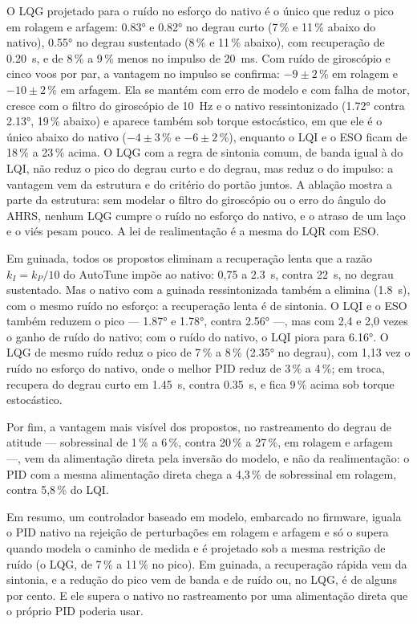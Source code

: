 O LQG projetado para o ruído no esforço do nativo é o único que reduz o pico
em rolagem e arfagem: \ang{0.83} e \ang{0.82} no degrau curto (7\,\% e
11\,\% abaixo do nativo), \ang{0.55} no degrau sustentado (8\,\% e 11\,\%
abaixo), com recuperação de \SI{0.20}{\second}, e de 8\,\% a 9\,\% menos no
impulso de \SI{20}{\milli\second}. Com ruído de giroscópio e cinco voos por
par, a vantagem no impulso se confirma: $-9 \pm 2$\,\% em rolagem e
$-10 \pm 2$\,\% em arfagem. Ela se mantém com erro de modelo e com falha de
motor, cresce com o filtro do giroscópio de \SI{10}{\hertz} e o nativo
ressintonizado (\ang{1.72} contra \ang{2.13}, 19\,\% abaixo) e aparece também
sob torque estocástico, em que ele é o único abaixo do nativo
($-4 \pm 3$\,\% e $-6 \pm 2$\,\%), enquanto o LQI e o ESO ficam de 18\,\% a
23\,\% acima. O LQG com a regra de sintonia comum, de banda igual à do LQI,
não reduz o pico do degrau curto e do degrau, mas reduz o do impulso: a
vantagem vem da estrutura e do critério do portão juntos. A ablação mostra a
parte da estrutura: sem modelar o filtro do giroscópio ou o erro do ângulo
do AHRS, nenhum LQG cumpre o ruído no esforço do nativo, e o atraso de um
laço e o viés pesam pouco. A lei de realimentação é a mesma do LQR com ESO.

Em guinada, todos os propostos eliminam a recuperação lenta que a razão
$k_I = k_P/10$ do AutoTune impõe ao nativo: 0,75 a \SI{2.3}{\second}, contra
\SI{22}{\second}, no degrau sustentado. Mas o nativo com a guinada
ressintonizada também a elimina (\SI{1.8}{\second}), com o mesmo ruído no
esforço: a recuperação lenta é de sintonia. O LQI e o ESO também reduzem o
pico --- \ang{1.87} e \ang{1.78}, contra \ang{2.56} ---, mas com 2,4 e 2,0
vezes o ganho de ruído do nativo; com o ruído do nativo, o LQI piora para
\ang{6.16}. O LQG de mesmo ruído reduz o pico de 7\,\% a 8\,\% (\ang{2.35}
no degrau), com 1,13 vez o ruído no esforço do nativo, onde o melhor PID
reduz de 3\,\% a 4\,\%; em troca, recupera do degrau curto em
\SI{1.45}{\second}, contra \SI{0.35}{\second}, e fica 9\,\% acima sob torque
estocástico.

Por fim, a vantagem mais visível dos propostos, no rastreamento do degrau de
atitude --- sobressinal de 1\,\% a 6\,\%, contra 20\,\% a 27\,\%, em rolagem e
arfagem ---, vem da alimentação direta pela inversão do modelo, e não da
realimentação: o PID com a mesma alimentação direta chega a 4,3\,\% de
sobressinal em rolagem, contra 5,8\,\% do LQI.

Em resumo, um controlador baseado em modelo, embarcado no firmware, iguala o
PID nativo na rejeição de perturbações em rolagem e arfagem e só o supera
quando modela o caminho de medida e é projetado sob a mesma restrição de
ruído (o LQG, de 7\,\% a 11\,\% no pico). Em guinada, a recuperação rápida
vem da sintonia, e a redução do pico vem de banda e de ruído ou, no LQG, é
de alguns por cento. E ele supera o nativo no rastreamento por uma
alimentação direta que o próprio PID poderia usar.

